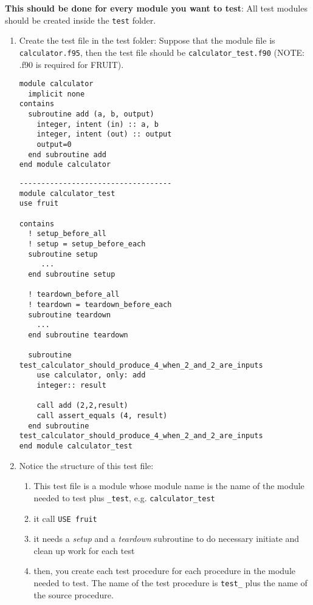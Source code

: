 {\bf This should be done for every module you want to test}: All test
modules should be created inside the \verb!test! folder.
\begin{enumerate}
\item Create the test file in the test folder: Suppose that the module
  file is \verb!calculator.f95!, then the test file should be
  \verb!calculator_test.f90! (NOTE: .f90 is required for FRUIT).
\begin{lstlisting}
module calculator
  implicit none
contains
  subroutine add (a, b, output)
    integer, intent (in) :: a, b
    integer, intent (out) :: output
    output=0
  end subroutine add
end module calculator
\end{lstlisting}
\begin{lstlisting}
-----------------------------------
module calculator_test
use fruit
 
contains
  ! setup_before_all
  ! setup = setup_before_each
  subroutine setup
     ...
  end subroutine setup
 
  ! teardown_before_all
  ! teardown = teardown_before_each
  subroutine teardown
    ...
  end subroutine teardown

  subroutine test_calculator_should_produce_4_when_2_and_2_are_inputs
    use calculator, only: add
    integer:: result
 
    call add (2,2,result)
    call assert_equals (4, result)
  end subroutine test_calculator_should_produce_4_when_2_and_2_are_inputs
end module calculator_test
\end{lstlisting}

\item Notice the structure of this test file: 
  \begin{enumerate}
  \item This test file is a module whose module name is the name of
    the module needed to test plus \verb!_test!,
    e.g. \verb!calculator_test!
  \item it call \verb!USE fruit!
  \item it needs a {\it setup} and a {\it teardown} subroutine to do
    necessary initiate and clean up work for each test
  \item then, you create each test procedure for each procedure in the
    module needed to test. The name of the test procedure is
    \verb!test_! plus the name of the source procedure.
  \end{enumerate}



\end{enumerate}
